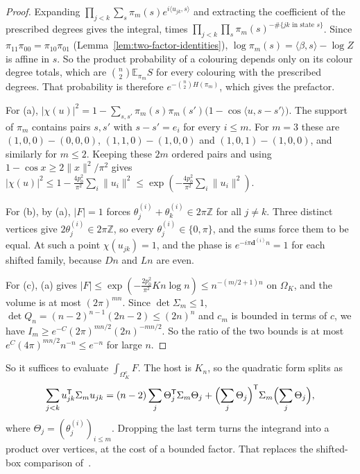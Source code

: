 \documentclass[11pt]{article}
\newcommand{\EE}{\mathbb{E}}
\begin{document}
\begin{proof}
Expanding \(\prod_{j<k}\sum_s\pi_m(s)e^{i\langle u_{jk},s\rangle}\) and extracting the
coefficient of the prescribed degrees gives the integral, times
\(\prod_{j<k}\prod_s\pi_m(s)^{-\#\{jk\text{ in state }s\}}\).
Since \(\pi_{11}\pi_{00}=\pi_{10}\pi_{01}\) (Lemma~\ref{lem:two-factor-identities}),
\(\log\pi_m(s)=\langle\beta,s\rangle-\log Z\) is affine in \(s\). So the product
probability of a colouring depends only on its colour degree totals, which are
\(\binom n2\EE_{\pi_m}S\) for every colouring with the prescribed degrees.
That probability is therefore \(e^{-\binom n2H(\pi_m)}\), which gives the prefactor.

For (a), \(|\chi(u)|^2=1-\sum_{s,s'}\pi_m(s)\pi_m(s')\bigl(1-\cos\langle u,s-s'\rangle\bigr)\).
The support of \(\pi_m\) contains pairs \(s,s'\) with \(s-s'=e_i\) for every
\(i\le m\). For \(m=3\) these are \((1,0,0)-(0,0,0)\), \((1,1,0)-(1,0,0)\) and
\((1,0,1)-(1,0,0)\), and similarly for \(m\le2\).
Keeping these \(2m\) ordered pairs and using \(1-\cos x\ge2\|x\|^2/\pi^2\) gives
\(|\chi(u)|^2\le1-\frac{4p_0^2}{\pi^2}\sum_i\|u_i\|^2\le\exp(-\frac{4p_0^2}{\pi^2}\sum_i\|u_i\|^2)\).

For (b), by (a), \(|F|=1\) forces \(\theta^{(i)}_j+\theta^{(i)}_k\in2\pi\mathbb Z\)
for all \(j\ne k\). Three distinct vertices give
\(2\theta^{(i)}_j\in2\pi\mathbb Z\), so every \(\theta^{(i)}_j\in\{0,\pi\}\), and the
sums force them to be equal.
At such a point \(\chi(u_{jk})=1\), and the phase is
\(e^{-i\pi\boldsymbol d^{(i)}n}=1\) for each shifted family, because \(Dn\) and
\(Ln\) are even.

For (c), (a) gives \(|F|\le\exp(-\frac{2p_0^2}{\pi^2}Kn\log n)\le n^{-(m/2+1)n}\)
on \(\Omega_K\), and the volume is at most \((2\pi)^{mn}\).
Since \(\det\Sigma_m\le1\), \(\det Q_n=(n-2)^{n-1}(2n-2)\le(2n)^n\) and \(c_m\) is
bounded in terms of \(c\), we have \(I_m\ge e^{-C}(2\pi)^{mn/2}(2n)^{-mn/2}\).
So the ratio of the two bounds is at most \(e^{C}(4\pi)^{mn/2}n^{-n}\le e^{-n}\)
for large \(n\).
\end{proof}

So it suffices to evaluate \(\int_{\Omega_K^c}F\).
The host is \(K_n\), so the quadratic form splits as
\[
\sum_{j<k}u_{jk}^{\mathsf T}\Sigma_mu_{jk}
=(n-2)\sum_j\Theta_j^{\mathsf T}\Sigma_m\Theta_j+\Bigl(\sum_j\Theta_j\Bigr)^{\mathsf T}\Sigma_m\Bigl(\sum_j\Theta_j\Bigr),
\]
where \(\Theta_j=(\theta^{(i)}_j)_{i\le m}\). Dropping the last term turns the
integrand into a product over vertices, at the cost of a bounded factor.
That replaces the shifted-box comparison of~\cite{IM25}.
\end{document}
